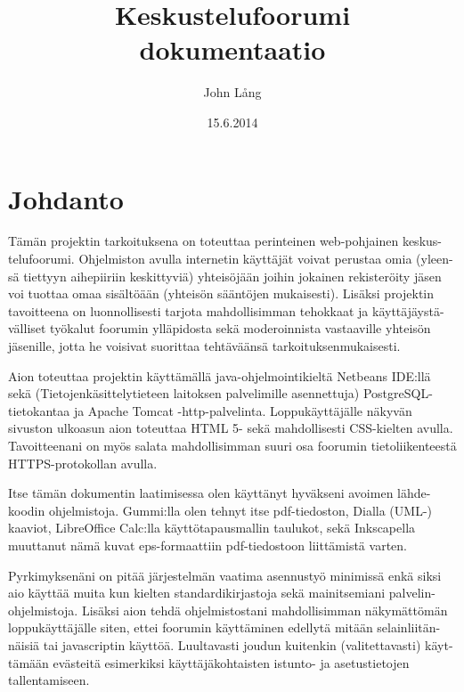 \documentclass[11pt]{article}
\title{\textbf{Keskustelufoorumi}\\ \small{dokumentaatio}}
\author{John Lång}
\date{15.6.2014}
\begin{document}
\maketitle

\thispagestyle{empty}

\newpage
\tableofcontents
\thispagestyle{empty}

\newpage

\section{Johdanto}
	Tämän projektin tarkoituksena on toteuttaa perinteinen web-pohjainen keskus-telufoorumi. Ohjelmiston
	avulla internetin käyttäjät voivat perustaa omia (yleen-sä tiettyyn aihepiiriin keskittyviä) yhteisöjään
	joihin jokainen rekisteröity jäsen voi tuottaa omaa sisältöään (yhteisön sääntöjen mukaisesti). Lisäksi
	projektin tavoitteena on luonnollisesti tarjota mahdollisimman tehokkaat ja käyttäjäystä-välliset työkalut 
	foorumin ylläpidosta sekä moderoinnista vastaaville yhteisön jäsenille, jotta he voisivat suorittaa
	tehtäväänsä	tarkoituksenmukaisesti.
		
	Aion toteuttaa projektin käyttämällä java-ohjelmointikieltä Netbeans IDE:llä sekä (Tietojenkäsittelytieteen laitoksen
	palvelimille asennettuja) PostgreSQL-tietokantaa ja Apache Tomcat -http-palvelinta. Loppukäyttäjälle
	näkyvän sivuston ulkoasun aion toteuttaa HTML 5- sekä mahdollisesti CSS-kielten avulla. Tavoitteenani
	on myös salata mahdollisimman suuri osa foorumin tietoliikenteestä HTTPS-protokollan avulla.
	
	Itse tämän dokumentin laatimisessa olen käyttänyt hyväkseni avoimen lähde-koodin ohjelmistoja.
	Gummi:lla olen tehnyt itse pdf-tiedoston, Dialla (UML-)\\ kaaviot, LibreOffice Calc:lla käyttötapausmallin
	taulukot, sekä Inkscapella muuttanut nämä kuvat eps-formaattiin pdf-tiedostoon liittämistä varten.
	
	Pyrkimyksenäni on pitää järjestelmän vaatima asennustyö minimissä enkä siksi aio käyttää muita kun kielten
	standardikirjastoja sekä mainitsemiani palvelin-ohjelmistoja. Lisäksi aion tehdä ohjelmistostani mahdollisimman näkymättömän loppukäyttäjälle
	siten, ettei foorumin käyttäminen edellytä mitään selainliitän-näisiä tai javascriptin käyttöä. Luultavasti
	joudun kuitenkin (valitettavasti) käyt-tämään evästeitä esimerkiksi käyttäjäkohtaisten istunto- ja
	asetustietojen tallentamiseen.
	
\end{document}
